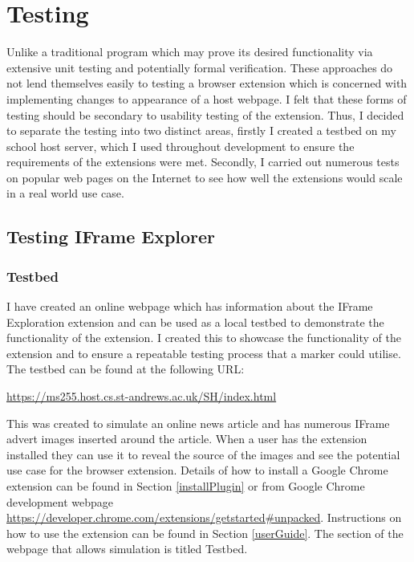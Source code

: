 \documentclass[12pt]{article}
\begin{document}
\pagebreak

\section{Testing}
Unlike a traditional program which may prove its desired functionality via extensive unit testing and potentially formal verification. These approaches do not lend themselves easily to testing a browser extension which is concerned with implementing changes to appearance of a host webpage. I felt that these forms of testing should be secondary to usability testing of the extension. Thus, I decided to separate the testing into two distinct areas, firstly I created a testbed on my school host server, which I used throughout development to ensure the requirements of the extensions were met. Secondly, I carried out numerous tests on popular web pages on the Internet to see how well the extensions would scale in a real world use case. 

\subsection{Testing IFrame Explorer}

\subsubsection{Testbed}
I have created an online webpage which has information about the IFrame Exploration extension and can be used as a local testbed to demonstrate the functionality of the extension. I created this to showcase the functionality of the extension and to ensure a repeatable testing process that a marker could utilise. The testbed can be found at the following URL: 

\begin{center}
\url{https://ms255.host.cs.st-andrews.ac.uk/SH/index.html}
\end{center}

This was created to simulate an online news article and has numerous IFrame advert images inserted around the article. When a user has the extension installed they can use it to reveal the source of the images and see the potential use case for the browser extension. Details of how to install a Google Chrome extension can be found in Section \ref{installPlugin} or from Google Chrome development webpage \url{https://developer.chrome.com/extensions/getstarted#unpacked}. Instructions on how to use the extension can be found in Section \ref{userGuide}. The section of the webpage that allows simulation is titled Testbed. 
\end{document}
